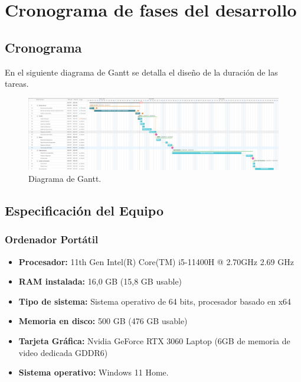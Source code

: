 \section{Cronograma de fases del desarrollo}

\subsection{Cronograma}
En el siguiente diagrama de Gantt se detalla el diseño de la duración de las tareas.

\begin{figure}[H]
    \centering
    \includegraphics[width=1\textwidth]{img/gantt.png}
    \caption{Diagrama de Gantt.}
    \label{fig:gantt}
\end{figure}

\subsection{Especificación del Equipo}
\label{subsec:Especificación del Equipo} %

\subsubsection{Ordenador Portátil}
\begin{itemize}
    \item \textbf{Procesador:} 11th Gen Intel(R) Core(TM) i5-11400H @ 2.70GHz 2.69 GHz
    \item \textbf{RAM instalada:} 16,0 GB (15,8 GB usable)
    \item \textbf{Tipo de sistema:} Sistema operativo de 64 bits, procesador basado en x64
    \item \textbf{Memoria en disco:} 500 GB (476 GB usable)
    \item \textbf{Tarjeta Gráfica:} Nvidia GeForce RTX 3060 Laptop (6GB de memoria de video dedicada GDDR6)
    \item \textbf{Sistema operativo:} Windows 11 Home.
\end{itemize}
